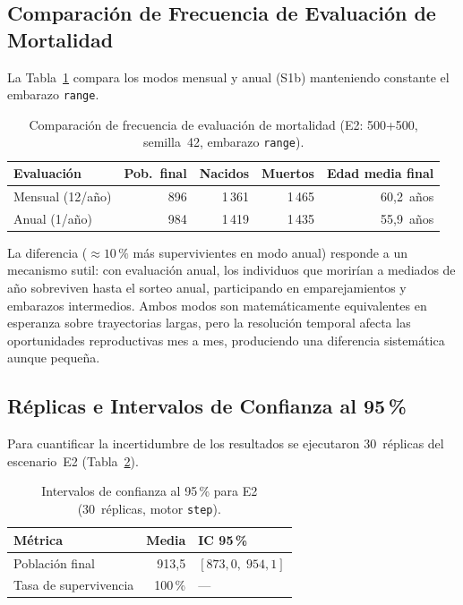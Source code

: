 \documentclass{llncs}
\begin{document}
\subsection{Comparación de Frecuencia de Evaluación de Mortalidad}

La Tabla~\ref{tab:comp_muerte} compara los modos mensual y anual (S1b)
manteniendo constante el embarazo \texttt{range}.

\begin{table}[H]
\caption{Comparación de frecuencia de evaluación de mortalidad
         (E2: 500+500, semilla~42, embarazo \texttt{range}).}
\label{tab:comp_muerte}
\centering
\begin{tabular}{lrrrr}
\toprule
\textbf{Evaluación} & \textbf{Pob.\ final} & \textbf{Nacidos} &
\textbf{Muertos} & \textbf{Edad media final} \\
\midrule
Mensual (12/año) & 896 & 1\,361 & 1\,465 & 60{,}2~años \\
Anual (1/año)    & 984 & 1\,419 & 1\,435 & 55{,}9~años \\
\bottomrule
\end{tabular}
\end{table}

La diferencia ($\approx 10\,\%$ más supervivientes en modo anual) responde
a un mecanismo sutil: con evaluación anual, los individuos que morirían a
mediados de año sobreviven hasta el sorteo anual, participando en
emparejamientos y embarazos intermedios.
Ambos modos son matemáticamente equivalentes en esperanza sobre trayectorias
largas, pero la resolución temporal afecta las oportunidades reproductivas
mes a mes, produciendo una diferencia sistemática aunque pequeña.

\subsection{Réplicas e Intervalos de Confianza al 95\,\%}

Para cuantificar la incertidumbre de los resultados se ejecutaron
30~réplicas del escenario~E2 (Tabla~\ref{tab:replicas}).

\begin{table}[H]
\caption{Intervalos de confianza al 95\,\% para E2 (30~réplicas,
         motor \texttt{step}).}
\label{tab:replicas}
\centering
\begin{tabular}{lrl}
\toprule
\textbf{Métrica} & \textbf{Media} & \textbf{IC 95\,\%} \\
\midrule
Población final       & 913{,}5 & $[873{,}0,\; 954{,}1]$ \\
Tasa de supervivencia & 100\,\% & --- \\
\bottomrule
\end{tabular}
\end{table}
\end{document}

